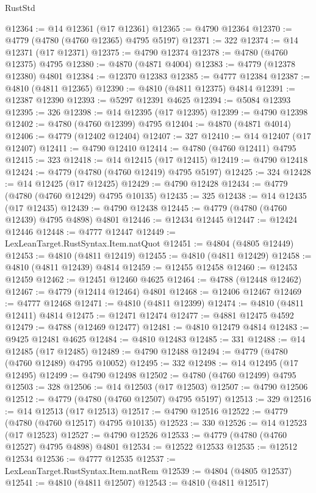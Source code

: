 \begin{lexlean}{RustStd}
\begin{coremodule}
@12364 := @14 @12361 (@17 @12361)
@12365 := @4790 @12364
@12370 := @4779 (@4780 (@4760 @12365) @4795 @5197)
@12371 := 322
@12374 := @14 @12371 (@17 @12371)
@12375 := @4790 @12374
@12378 := @4780 (@4760 @12375) @4795
@12380 := @4870 (@4871 @4004)
@12383 := @4779 (@12378 @12380) @4801
@12384 := @12370 @12383
@12385 := @4777 @12384
@12387 := @4810 (@4811 @12365)
@12390 := @4810 (@4811 @12375) @4814
@12391 := @12387 @12390
@12393 := @5297 @12391 @4625
@12394 := @5084 @12393
@12395 := 326
@12398 := @14 @12395 (@17 @12395)
@12399 := @4790 @12398
@12402 := @4780 (@4760 @12399) @4795
@12404 := @4870 (@4871 @4014)
@12406 := @4779 (@12402 @12404)
@12407 := 327
@12410 := @14 @12407 (@17 @12407)
@12411 := @4790 @12410
@12414 := @4780 (@4760 @12411) @4795
@12415 := 323
@12418 := @14 @12415 (@17 @12415)
@12419 := @4790 @12418
@12424 := @4779 (@4780 (@4760 @12419) @4795 @5197)
@12425 := 324
@12428 := @14 @12425 (@17 @12425)
@12429 := @4790 @12428
@12434 := @4779 (@4780 (@4760 @12429) @4795 @10135)
@12435 := 325
@12438 := @14 @12435 (@17 @12435)
@12439 := @4790 @12438
@12445 := @4779 (@4780 (@4760 @12439) @4795 @4898) @4801
@12446 := @12434 @12445
@12447 := @12424 @12446
@12448 := @4777 @12447
@12449 := LexLeanTarget.RustSyntax.Item.natQuot
@12451 := @4804 (@4805 @12449)
@12453 := @4810 (@4811 @12419)
@12455 := @4810 (@4811 @12429)
@12458 := @4810 (@4811 @12439) @4814
@12459 := @12455 @12458
@12460 := @12453 @12459
@12462 := @12451 @12460 @4625
@12464 := @4788 (@12448 @12462)
@12467 := @4779 (@12414 @12464) @4801
@12468 := @12406 @12467
@12469 := @4777 @12468
@12471 := @4810 (@4811 @12399)
@12474 := @4810 (@4811 @12411) @4814
@12475 := @12471 @12474
@12477 := @4881 @12475 @4592
@12479 := @4788 (@12469 @12477)
@12481 := @4810 @12479 @4814
@12483 := @9425 @12481 @4625
@12484 := @4810 @12483
@12485 := 331
@12488 := @14 @12485 (@17 @12485)
@12489 := @4790 @12488
@12494 := @4779 (@4780 (@4760 @12489) @4795 @10052)
@12495 := 332
@12498 := @14 @12495 (@17 @12495)
@12499 := @4790 @12498
@12502 := @4780 (@4760 @12499) @4795
@12503 := 328
@12506 := @14 @12503 (@17 @12503)
@12507 := @4790 @12506
@12512 := @4779 (@4780 (@4760 @12507) @4795 @5197)
@12513 := 329
@12516 := @14 @12513 (@17 @12513)
@12517 := @4790 @12516
@12522 := @4779 (@4780 (@4760 @12517) @4795 @10135)
@12523 := 330
@12526 := @14 @12523 (@17 @12523)
@12527 := @4790 @12526
@12533 := @4779 (@4780 (@4760 @12527) @4795 @4898) @4801
@12534 := @12522 @12533
@12535 := @12512 @12534
@12536 := @4777 @12535
@12537 := LexLeanTarget.RustSyntax.Item.natRem
@12539 := @4804 (@4805 @12537)
@12541 := @4810 (@4811 @12507)
@12543 := @4810 (@4811 @12517)

\end{coremodule}
\end{lexlean}
